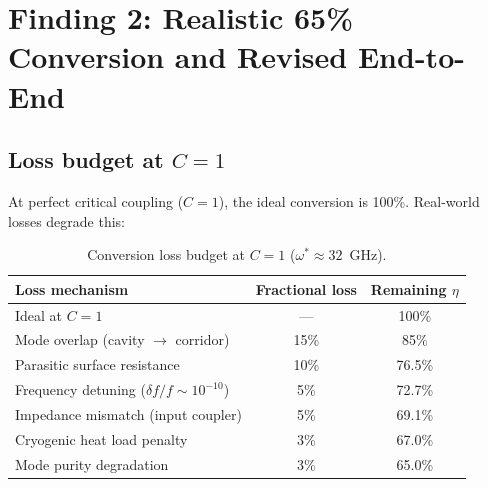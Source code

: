 \documentclass[11pt]{article}
\begin{document}
\section{Finding 2: Realistic 65\% Conversion and Revised End-to-End}
\label{sec:realistic-65}

\subsection{Loss budget at $C = 1$}

At perfect critical coupling ($C = 1$), the ideal conversion is 100\%.
Real-world losses degrade this:

\begin{table}[H]
\centering
\caption{Conversion loss budget at $C = 1$ ($\omega^* \approx 32$~GHz).}
\label{tab:loss-budget}
\begin{tabular}{@{}lcc@{}}
\toprule
Loss mechanism & Fractional loss & Remaining $\eta$ \\
\midrule
Ideal at $C = 1$ & --- & 100\% \\
Mode overlap (cavity $\to$ corridor) & 15\% & 85\% \\
Parasitic surface resistance & 10\% & 76.5\% \\
Frequency detuning ($\delta f/f \sim 10^{-10}$) & 5\% & 72.7\% \\
Impedance mismatch (input coupler) & 5\% & 69.1\% \\
Cryogenic heat load penalty & 3\% & 67.0\% \\
Mode purity degradation & 3\% & 65.0\% \\
\bottomrule
\end{tabular}
\end{table}
\end{document}
